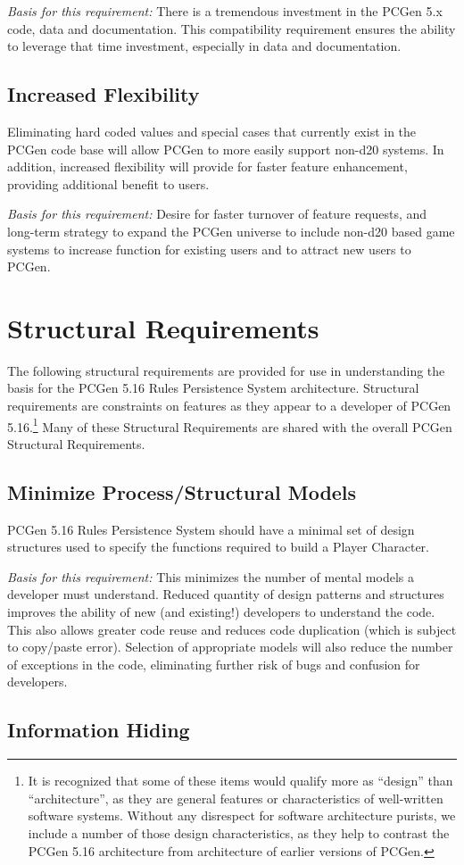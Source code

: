 \documentclass[12pt,letterpaper]{article}
\newcommand{\pcgenversEOS}{5.16}
\newcommand{\systemEOS}{Rules Persistence System}
\newcommand{\system}{\systemEOS{} }
\newcommand{\pcgenvers}{\pcgenversEOS{} }
\newcommand{\textem}[1]{\emph{#1}}
\newcommand{\nsection}[1]{\newpage \section{#1}}
\newcommand{\lnsection}[1]{\label{#1}\nsection{#1}}
\newcommand{\lsubsection}[1]{\label{#1}\subsection{#1}}
\newcommand{\basis}{\noindent\textem{Basis for this requirement:} }
\begin{document}
\basis There is a tremendous investment in the PCGen 5.x code, data and documentation.  This compatibility
requirement ensures the ability to leverage that time investment, especially in data and documentation.

\lsubsection{Increased Flexibility}

Eliminating hard coded values and special cases that currently exist in the PCGen code base will
allow PCGen to more easily support non-d20 systems.  In addition, increased flexibility will provide
for faster feature enhancement, providing additional benefit to users.

\basis Desire for faster turnover of feature requests, and long-term strategy to expand 
the PCGen universe to include non-d20 based game systems to increase function
for existing users and to attract new users to PCGen.

\lnsection{Structural Requirements}

The following structural requirements are provided for use in understanding the basis for the
PCGen \pcgenvers \system architecture.  Structural requirements are constraints on features as they appear
to a developer of PCGen \pcgenversEOS.\footnote{It is recognized that some of these items would
qualify more as ``design'' than ``architecture'', as they are general features or characteristics
of well-written software systems.  Without any disrespect for software architecture purists, we
include a number of those design characteristics, as they help to contrast the PCGen 
\pcgenvers architecture from architecture of earlier versions of PCGen.}   Many of these Structural
Requirements are shared with the overall PCGen Structural Requirements.

\lsubsection{Minimize Process/Structural Models}

PCGen \pcgenvers \system should have a minimal set of design structures used to specify the functions
required to build a Player Character. 

\basis This minimizes the number of mental models a developer must understand. Reduced quantity
of design patterns and structures improves the ability of new (and existing!) developers to
understand the code.  This also allows greater code reuse and reduces code duplication (which
is subject to copy/paste error).  Selection of appropriate models will also reduce the number
of exceptions in the code, eliminating further risk of bugs and confusion for developers.

\lsubsection{Information Hiding}
\end{document}
